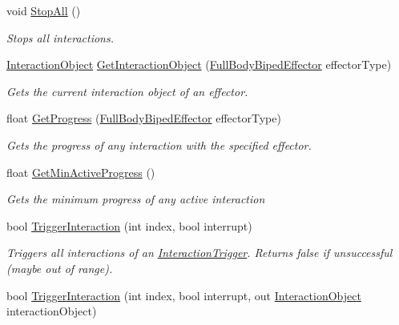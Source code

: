 \begin{DoxyCompactItemize}
void \mbox{\hyperlink{class_root_motion_1_1_final_i_k_1_1_interaction_system_a225aa428c042588350f8724862e10a4f}{Stop\+All}} ()
\begin{DoxyCompactList}\small\item\em Stops all interactions. \end{DoxyCompactList}\item 
\mbox{\hyperlink{class_root_motion_1_1_final_i_k_1_1_interaction_object}{Interaction\+Object}} \mbox{\hyperlink{class_root_motion_1_1_final_i_k_1_1_interaction_system_ad74b465115fe9bb8ee688ff02acf89cb}{Get\+Interaction\+Object}} (\mbox{\hyperlink{namespace_root_motion_1_1_final_i_k_ae0dd2058c7667b6f132c11a6b860c14a}{Full\+Body\+Biped\+Effector}} effector\+Type)
\begin{DoxyCompactList}\small\item\em Gets the current interaction object of an effector. \end{DoxyCompactList}\item 
float \mbox{\hyperlink{class_root_motion_1_1_final_i_k_1_1_interaction_system_a54aeb2fd1eb7a0e15b410628709f4fbd}{Get\+Progress}} (\mbox{\hyperlink{namespace_root_motion_1_1_final_i_k_ae0dd2058c7667b6f132c11a6b860c14a}{Full\+Body\+Biped\+Effector}} effector\+Type)
\begin{DoxyCompactList}\small\item\em Gets the progress of any interaction with the specified effector. \end{DoxyCompactList}\item 
float \mbox{\hyperlink{class_root_motion_1_1_final_i_k_1_1_interaction_system_ace80fa123c986c5679575b9fe5c4fd4d}{Get\+Min\+Active\+Progress}} ()
\begin{DoxyCompactList}\small\item\em Gets the minimum progress of any active interaction \end{DoxyCompactList}\item 
bool \mbox{\hyperlink{class_root_motion_1_1_final_i_k_1_1_interaction_system_a652cbce893d957ae9604d8ef8a99fe90}{Trigger\+Interaction}} (int index, bool interrupt)
\begin{DoxyCompactList}\small\item\em Triggers all interactions of an \mbox{\hyperlink{class_root_motion_1_1_final_i_k_1_1_interaction_trigger}{Interaction\+Trigger}}. Returns false if unsuccessful (maybe out of range). \end{DoxyCompactList}\item 
bool \mbox{\hyperlink{class_root_motion_1_1_final_i_k_1_1_interaction_system_a270081b8d7c79351b4f3911f02dc12cb}{Trigger\+Interaction}} (int index, bool interrupt, out \mbox{\hyperlink{class_root_motion_1_1_final_i_k_1_1_interaction_object}{Interaction\+Object}} interaction\+Object)

\end{DoxyCompactItemize}
